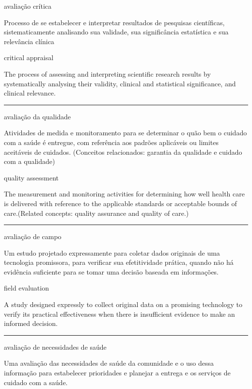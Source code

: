\documentclass[
  openany]{book}
\begin{document}
avaliação crítica

Processo de se estabelecer e interpretar resultados de pesquisas científicas, sistematicamente analisando sua validade, sua significância estatística e sua relevância clínica

critical appraisal

The process of assessing and interpreting scientific research results by systematically analysing their validity, clinical and statistical significance, and clinical relevance.

\begin{center}\rule{0.5\linewidth}{0.5pt}\end{center}

avaliação da qualidade

Atividades de medida e monitoramento para se determinar o quão bem o cuidado com a saúde é entregue, com referência aos padrões aplicáveis ou limites aceitáveis de cuidados. (Conceitos relacionados: garantia da qualidade e cuidado com a qualidade)

quality assessment

The measurement and monitoring activities for determining how well health care is delivered with reference to the applicable standards or acceptable bounds of care.(Related concepts: quality assurance and quality of care.)

\begin{center}\rule{0.5\linewidth}{0.5pt}\end{center}

avaliação de campo

Um estudo projetado expressamente para coletar dados originais de uma tecnologia promissora, para verificar sua efetitividade prática, quando não há evidência suficiente para se tomar uma decisão baseada em informações.

field evaluation

A study designed expressly to collect original data on a promising technology to verify its practical effectiveness when there is insufficient evidence to make an informed decision.

\begin{center}\rule{0.5\linewidth}{0.5pt}\end{center}

avaliação de necessidades de saúde

Uma avaliação das necessidades de saúde da comunidade e o uso dessa informação para estabelecer prioridades e planejar a entrega e os serviços de cuidado com a saúde.
\end{document}
